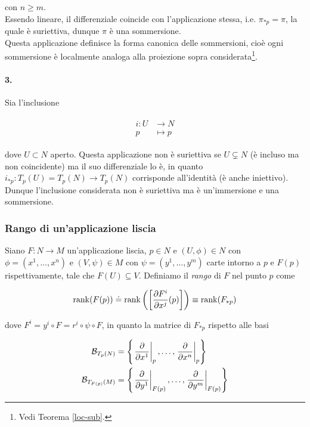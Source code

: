 con $ n \geqslant m $.\\
Essendo lineare, il differenziale coincide con l'applicazione stessa, i.e. $ \pi_{*p} = \pi $, la quale è suriettiva, dunque $ \pi $ è una sommersione.\\
Questa applicazione definisce la forma canonica delle sommersioni, cioè ogni sommersione è localmente analoga alla proiezione sopra considerata\footnote{%
	Vedi Teorema \ref{loc-sub}.%
}.

\paragraph{3.}

Sia l'inclusione

\begin{align}
	\begin{split}
		i : U &\to N\\
		p &\mapsto p
	\end{split}
\end{align}

dove $ U \subset N $ aperto. Questa applicazione non è suriettiva se $ U \subsetneq N $ (è incluso ma non coincidente) ma il suo differenziale lo è, in quanto $ i_{*p} : T_{p}(U) = T_{p}(N) \to T_{p}(N) $ corrisponde all'identità (è anche iniettivo).\\
Dunque l'inclusione considerata non è suriettiva ma è un'immersione e una sommersione.

\subsubsection{Rango di un'applicazione liscia}

Siano $ F : N \to M $ un'applicazione liscia, $ p \in N $ e $ (U,\phi) \in N $ con $ \phi = (x^{1},\dots,x^{n}) $ e $ (V,\psi) \in M $ con $ \psi = (y^{1},\dots,y^{m}) $ carte intorno a $ p $ e $ F(p) $ rispettivamente, tale che $ F(U) \subseteq V $. Definiamo il \textit{rango} di $ F $ nel punto $ p $ come

\begin{equation}
	\rank(F(p)) \doteq \rank\left( \left[ \dfrac{\partial F^{i}}{\partial x^{j}} (p) \right] \right) \equiv \rank(F_{*p})
\end{equation}

dove $ F^{i} = y^{i} \circ F = r^{i} \circ \psi \circ F $, in quanto la matrice di $ F_{*p} $ rispetto alle basi

\begin{align}
	\begin{split}
		\mathcal{B}_{T_{p}(N)} &= \left\{ \eval{\pdv{x^{1}}}_{p}, \dots, \eval{\pdv{x^{n}}}_{p} \right\}\\
		\mathcal{B}_{T_{F(p)}(M)} &= \left\{ \eval{\pdv{y^{1}}}_{F(p)}, \dots, \eval{\pdv{y^{m}}}_{F(p)} \right\}
	\end{split}
\end{align}


